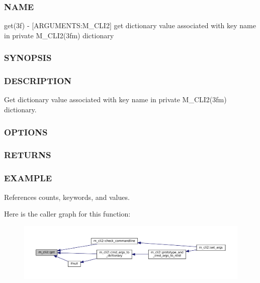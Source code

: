 \subsubsection*{N\+A\+ME}

get(3f) -\/ \mbox{[}A\+R\+G\+U\+M\+E\+N\+TS\+:M\+\_\+\+C\+L\+I2\mbox{]} get dictionary value associated with key name in private M\+\_\+\+C\+L\+I2(3fm) dictionary \subsubsection*{S\+Y\+N\+O\+P\+S\+IS}

\subsubsection*{D\+E\+S\+C\+R\+I\+P\+T\+I\+ON}

Get dictionary value associated with key name in private M\+\_\+\+C\+L\+I2(3fm) dictionary. \subsubsection*{O\+P\+T\+I\+O\+NS}

\subsubsection*{R\+E\+T\+U\+R\+NS}

\subsubsection*{E\+X\+A\+M\+P\+LE}

References counts, keywords, and values.

Here is the caller graph for this function\+:
\nopagebreak
\begin{figure}[H]
\begin{center}
\leavevmode
\includegraphics[width=350pt]{namespacem__cli2_aa92e8ad0300d4e324e29eae1ab9d04b4_icgraph}
\end{center}
\end{figure}
\mbox{\label{namespacem__cli2_a448e8e24406f4bdbc14f26a940cbbc2c}} 
